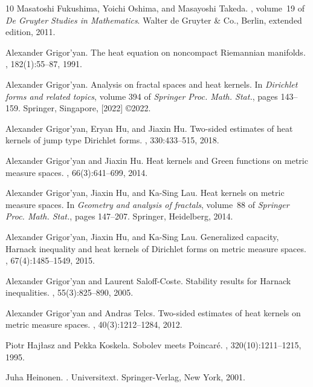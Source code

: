 \documentclass[11pt,a4paper]{article}
\numberwithin{equation}{section}
\theoremstyle{plain}
\theoremstyle{definition}
\begin{document}
\begin{thebibliography}{10}
Masatoshi Fukushima, Yoichi Oshima, and Masayoshi Takeda.
, volume~19 of
  {\em De Gruyter Studies in Mathematics}.
\newblock Walter de Gruyter \& Co., Berlin, extended edition, 2011.

Alexander Grigor'yan.
\newblock The heat equation on noncompact {R}iemannian manifolds.
, 182(1):55--87, 1991.

Alexander Grigor'yan.
\newblock Analysis on fractal spaces and heat kernels.
\newblock In {\em Dirichlet forms and related topics}, volume 394 of {\em
  Springer Proc. Math. Stat.}, pages 143--159. Springer, Singapore, [2022]
  \copyright 2022.

Alexander Grigor'yan, Eryan Hu, and Jiaxin Hu.
\newblock Two-sided estimates of heat kernels of jump type {D}irichlet forms.
, 330:433--515, 2018.

Alexander Grigor'yan and Jiaxin Hu.
\newblock Heat kernels and {G}reen functions on metric measure spaces.
, 66(3):641--699, 2014.

Alexander Grigor'yan, Jiaxin Hu, and Ka-Sing Lau.
\newblock Heat kernels on metric measure spaces.
\newblock In {\em Geometry and analysis of fractals}, volume~88 of {\em
  Springer Proc. Math. Stat.}, pages 147--207. Springer, Heidelberg, 2014.

Alexander Grigor'yan, Jiaxin Hu, and Ka-Sing Lau.
\newblock Generalized capacity, {H}arnack inequality and heat kernels of
  {D}irichlet forms on metric measure spaces.
, 67(4):1485--1549, 2015.

Alexander Grigor'yan and Laurent Saloff-Coste.
\newblock Stability results for {H}arnack inequalities.
, 55(3):825--890, 2005.

Alexander Grigor'yan and Andras Telcs.
\newblock Two-sided estimates of heat kernels on metric measure spaces.
, 40(3):1212--1284, 2012.

Piotr Haj{\l}asz and Pekka Koskela.
\newblock Sobolev meets {P}oincar\'e.
, 320(10):1211--1215,
  1995.

Juha Heinonen.
.
\newblock Universitext. Springer-Verlag, New York, 2001.


\end{thebibliography}
\end{document}
